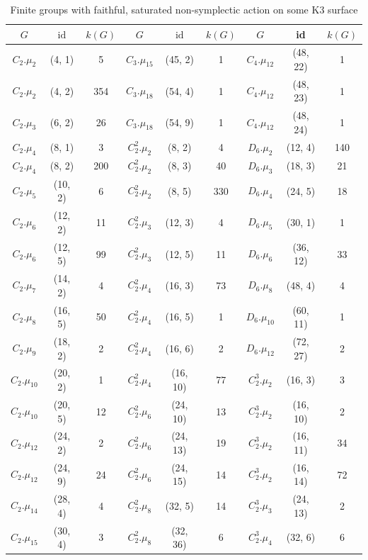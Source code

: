 \documentclass[a4paper]{amsart}
\theoremstyle{definition}
\theoremstyle{plain}
\begin{document}
\renewcommand{\arraystretch}{1.2}
{\small
\begin{longtable}{ccc|ccc|ccc}
  \caption{Finite groups with faithful, saturated non-symplectic action on some K3 surface}\label{table:action}\\
  $G$&$\mathrm{id} $& $k(G)$ & $G$&$\mathrm{id} $& $k(G)$ & $G$ & id & $k(G)$ \\
  \hline
  \endhead
%
%
%
%
%
\rowcolor{lightgray}
$C_2.\mu_{2}$&(4, 1)&5 & $C_3.\mu_{15}$&(45, 2)&1   &  $C_4.\mu_{12}$&(48, 22)&1\\
$C_2.\mu_{2}$&(4, 2)&354 & $C_3.\mu_{18}$&(54, 4)&1   &  $C_4.\mu_{12}$&(48, 23)&1\\
\rowcolor{lightgray}
$C_2.\mu_{3}$&(6, 2)&26 & $C_3.\mu_{18}$&(54, 9)&1   &  $C_4.\mu_{12}$&(48, 24)&1\\
$C_2.\mu_{4}$&(8, 1)&3 & $C_2^2.\mu_{2}$&(8, 2)&4   &  $D_6.\mu_{2}$&(12, 4)&140\\
\rowcolor{lightgray}
$C_2.\mu_{4}$&(8, 2)&200 & $C_2^2.\mu_{2}$&(8, 3)&40   &  $D_6.\mu_{3}$&(18, 3)&21\\
$C_2.\mu_{5}$&(10, 2)&6 & $C_2^2.\mu_{2}$&(8, 5)&330  &  $D_6.\mu_{4}$&(24, 5)&18\\
\rowcolor{lightgray}
$C_2.\mu_{6}$&(12, 2)&11 & $C_2^2.\mu_{3}$&(12, 3)&4  &  $D_6.\mu_{5}$&(30, 1)&1\\
$C_2.\mu_{6}$&(12, 5)&99 & $C_2^2.\mu_{3}$&(12, 5)&11  &  $D_6.\mu_{6}$&(36, 12)&33\\
\rowcolor{lightgray}
$C_2.\mu_{7}$&(14, 2)&4 & $C_2^2.\mu_{4}$&(16, 3)&73 & $D_6.\mu_{8}$&(48, 4)&4\\
$C_2.\mu_{8}$&(16, 5)&50 & $C_2^2.\mu_{4}$&(16, 5)&1 & $D_6.\mu_{10}$&(60, 11)&1\\
\rowcolor{lightgray}
$C_2.\mu_{9}$&(18, 2)&2 & $C_2^2.\mu_{4}$&(16, 6)&2 & $D_6.\mu_{12}$&(72, 27)&2\\
$C_2.\mu_{10}$&(20, 2)&1 & $C_2^2.\mu_{4}$&(16, 10)&77 & $C_2^3.\mu_{2}$&(16, 3)&3\\
\rowcolor{lightgray}
$C_2.\mu_{10}$&(20, 5)&12 & $C_2^2.\mu_{6}$&(24, 10)&13 & $C_2^3.\mu_{2}$&(16, 10)&2\\
$C_2.\mu_{12}$&(24, 2)&2 & $C_2^2.\mu_{6}$&(24, 13)&19 & $C_2^3.\mu_{2}$&(16, 11)&34\\
\rowcolor{lightgray}
$C_2.\mu_{12}$&(24, 9)&24 & $C_2^2.\mu_{6}$&(24, 15)&14 & $C_2^3.\mu_{2}$&(16, 14)&72\\
$C_2.\mu_{14}$&(28, 4)&4 & $C_2^2.\mu_{8}$&(32, 5)&14 & $C_2^3.\mu_{3}$&(24, 13)&2\\
\rowcolor{lightgray}
$C_2.\mu_{15}$&(30, 4)&3 & $C_2^2.\mu_{8}$&(32, 36)&6 & $C_2^3.\mu_{4}$&(32, 6)&6\\

\end{longtable}}
\end{document}
